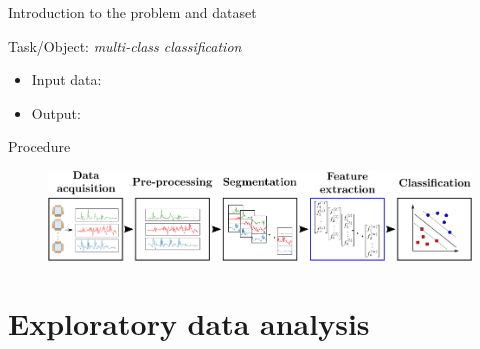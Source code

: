 \documentclass{if-beamer}
\begin{document}
\begin{frame}{Introduction to the problem and dataset}
        \begin{block}{Task/Object: \emph{multi-class classification}}
                            \begin{itemize}
                            \item Input data:
                            
                                 
                            \item Output: 
                                 
                    \end{itemize}
        \end{block}
         
         
         \begin{block}{Procedure} 
                 \begin{figure}
        \includegraphics[scale=0.35]{./figs/process.png}
        \end{figure}
    \end{block}

\end{frame}




\section{Exploratory data analysis}
\end{document}
